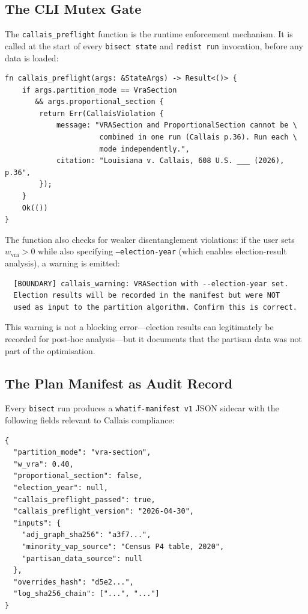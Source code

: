 \subsection{The CLI Mutex Gate}

The \texttt{callais\_preflight} function is the runtime enforcement mechanism.
It is called at the start of every \texttt{bisect state} and \texttt{redist run}
invocation, before any data is loaded:

\begin{verbatim}
fn callais_preflight(args: &StateArgs) -> Result<()> {
    if args.partition_mode == VraSection
       && args.proportional_section {
        return Err(CallaísViolation {
            message: "VRASection and ProportionalSection cannot be \
                      combined in one run (Callais p.36). Run each \
                      mode independently.",
            citation: "Louisiana v. Callais, 608 U.S. ___ (2026), p.36",
        });
    }
    Ok(())
}
\end{verbatim}

The function also checks for weaker disentanglement violations: if the user
sets $w_\text{vra} > 0$ while also specifying \texttt{--election-year}
(which enables election-result analysis), a warning is emitted:

\begin{verbatim}
  [BOUNDARY] callais_warning: VRASection with --election-year set.
  Election results will be recorded in the manifest but were NOT
  used as input to the partition algorithm. Confirm this is correct.
\end{verbatim}

This warning is not a blocking error---election results can legitimately be
recorded for post-hoc analysis---but it documents that the partisan data was
not part of the optimisation.

\subsection{The Plan Manifest as Audit Record}

Every \texttt{bisect} run produces a \texttt{whatif-manifest v1} JSON sidecar
with the following fields relevant to Callais compliance:

\begin{verbatim}
{
  "partition_mode": "vra-section",
  "w_vra": 0.40,
  "proportional_section": false,
  "election_year": null,
  "callais_preflight_passed": true,
  "callais_preflight_version": "2026-04-30",
  "inputs": {
    "adj_graph_sha256": "a3f7...",
    "minority_vap_source": "Census P4 table, 2020",
    "partisan_data_source": null
  },
  "overrides_hash": "d5e2...",
  "log_sha256_chain": ["...", "..."]
}
\end{verbatim}

